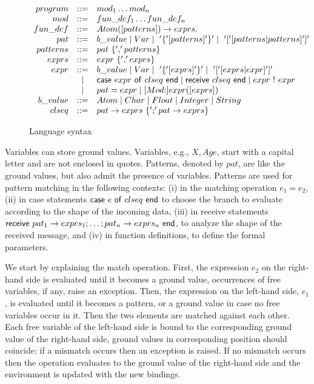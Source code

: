 \documentclass{article}[12pt,a4paper]
\theoremstyle{definition}
\newcommand{\cons}{\mbox{:}}
\begin{document}
\begin{figure}[t]
  \begin{center}
    $
    \begin{array}{rcl@{~~~~~~}l}

      program & ::= & mod_1  \dots  mod_n \\
      mod & ::= & fun\_def_1  \dots fun\_def_n  \\
      fun\_def & ::= & Atom([patterns]) \to exprs.\\
      pat & ::= & b\_value \mid Var \mid ~'\{'[patterns]'\}' \mid ~
                  '['[patterns|patterns] ']'\\
      patterns & ::= & pat ~\{ ','patterns\} \\
      exprs & ::= & expr ~\{ ',' exprs\} \\
      expr & ::= & b\_value \mid Var \mid ~'\{'[exprs]'\}' \mid ~'[' [exprs|expr] ']' \\
                    & \mid & \ms{case}~expr~\ms{of}~clseq~\mathsf{end} \mid
                             \ms{receive}~clseq~\mathsf{end} \mid expr ~ ! ~ expr \\
                    & \mid & pat = expr \mid
                             [Mod\cons]expr([exprs]) \\
      b\_value & ::= & Atom \mid Char \mid Float \mid Integer \mid String \\
      clseq & ::= & pat  \to exprs ~ \{ ';' pat \to exprs  \} \\
    \end{array}
    $
  \end{center}
  \caption{Language syntax} \label{ErlangSyntax}
\end{figure}

Variables can store ground values. Variables, e.g., $X,Age$, start with a capital letter and
are not enclosed in quotes.
Patterns, denoted by $pat$, are like the ground values,
but also admit the presence of variables. Patterns are used for pattern matching in the following contexts: (i) in the matching operation $e_1 = e_2$, (ii) in case statements $\mathsf{case}~e~\mathsf{of}~clseq~\mathsf{end}$ to choose the branch
to evaluate according to the shape of the incoming data,
(iii) in receive
statements $\mathsf{receive}~pat_1 \rightarrow exprs_1; \ldots; pat_n
\rightarrow exprs_n~\mathsf{end}$, to analyze the shape of the received message, and
(iv) in function
definitions, to define the formal parameters. 

We start by explaining the match operation. First, the expression $e_2$ on
the right-hand side is evaluated until it becomes a ground value,
occurrences of free variables, if any, raise an exception.
Then, the expression on the left-hand side, $e_1$, is evaluated until
it becomes a pattern, or a ground value in case no free variables
occur in it. Then the
two elements are matched against each other. Each free variable of the
left-hand side is bound to the corresponding ground value of the right-hand
side, ground values in corresponding position should coincide: if a mismatch occurs then an exception
is raised. If no mismatch occurs then the operation evaluates to the ground
value of the right-hand side and the environment is updated with the new bindings.
\end{document}
